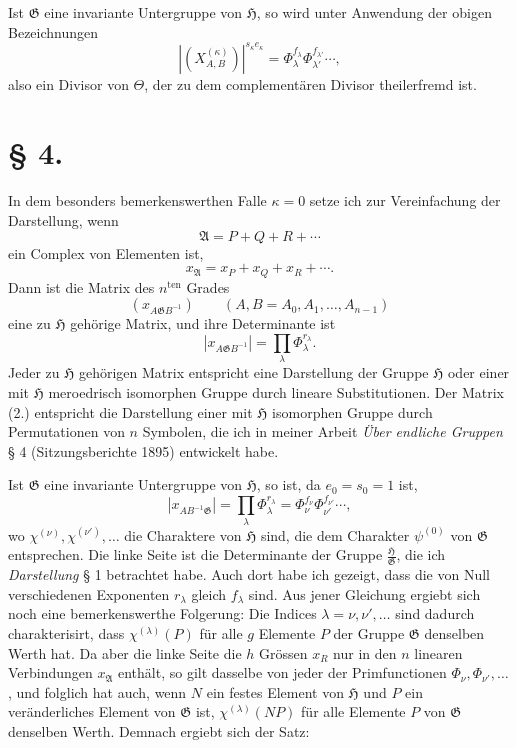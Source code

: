 \documentclass[11pt]{article}
\newcommand{\Hgr}{\mathfrak{H}}
\newcommand{\Ggr}{\mathfrak{G}}
\begin{document}
Ist $\Ggr$ eine invariante Untergruppe von $\Hgr$, so wird unter Anwendung der obigen Bezeichnungen
\[
\tag{8.}
  |(X^{(\kappa)}_{A,B})|^{s_\kappa e_\kappa}
  =
  \Phi_\lambda^{f_\lambda}\Phi_{\lambda'}^{f_{\lambda'}}\cdots,
\]
also ein Divisor von $\Theta$, der zu dem complementären Divisor theilerfremd ist.

\section*{§ 4.}

In dem besonders bemerkenswerthen Falle $\kappa=0$ setze ich zur Vereinfachung der Darstellung, wenn
\[
  \mathfrak A=P+Q+R+\cdots
\]
ein Complex von Elementen ist,
\[
\tag{1.}
  x_{\mathfrak A}=x_P+x_Q+x_R+\cdots.
\]
Dann ist die Matrix des $n^{\mathrm{ten}}$ Grades
\[
\tag{2.}
  (x_{A\Ggr B^{-1}})\qquad(A,B=A_0,A_1,\ldots,A_{n-1})
\]
eine zu $\Hgr$ gehörige Matrix, und ihre Determinante ist
\[
\tag{3.}
  |x_{A\Ggr B^{-1}}|=\prod_\lambda \Phi_\lambda^{r_\lambda}.
\]
Jeder zu $\Hgr$ gehörigen Matrix entspricht eine Darstellung der Gruppe $\Hgr$ oder einer mit $\Hgr$ meroedrisch isomorphen Gruppe durch lineare Substitutionen. Der Matrix (2.) entspricht die Darstellung einer mit $\Hgr$ isomorphen Gruppe durch Permutationen von $n$ Symbolen, die ich in meiner Arbeit \emph{Über endliche Gruppen} § 4 (Sitzungsberichte 1895) entwickelt habe.

Ist $\Ggr$ eine invariante Untergruppe von $\Hgr$, so ist, da $e_0=s_0=1$ ist,
\[
\tag{4.}
  |x_{AB^{-1}\Ggr}|=\prod_\lambda\Phi_\lambda^{r_\lambda}
  =
  \Phi_\nu^{f_\nu}\Phi_{\nu'}^{f_{\nu'}}\cdots,
\]
wo $\chi^{(\nu)},\chi^{(\nu')},\ldots$ die Charaktere von $\Hgr$ sind, die dem Charakter $\psi^{(0)}$ von $\Ggr$ entsprechen. Die linke Seite ist die Determinante der Gruppe $\frac{\Hgr}{\Ggr}$, die ich \emph{Darstellung} § 1 betrachtet habe. Auch dort habe ich gezeigt, dass die von Null verschiedenen Exponenten $r_\lambda$ gleich $f_\lambda$ sind. Aus jener Gleichung ergiebt sich noch eine bemerkenswerthe Folgerung: Die Indices $\lambda=\nu,\nu',\ldots$ sind dadurch charakterisirt, dass $\chi^{(\lambda)}(P)$ für alle $g$ Elemente $P$ der Gruppe $\Ggr$ denselben Werth hat. Da aber die linke Seite die $h$ Grössen $x_R$ nur in den $n$ linearen Verbindungen $x_{\mathfrak A}$ enthält, so gilt dasselbe von jeder der Primfunctionen $\Phi_\nu,\Phi_{\nu'},\ldots$, und folglich hat auch, wenn $N$ ein festes Element von $\Hgr$ und $P$ ein veränderliches Element von $\Ggr$ ist, $\chi^{(\lambda)}(NP)$ für alle Elemente $P$ von $\Ggr$ denselben Werth. Demnach ergiebt sich der Satz:
\end{document}
